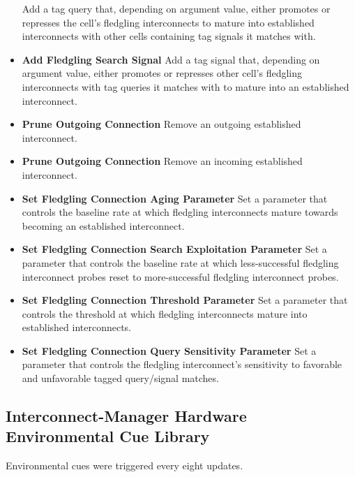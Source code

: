 \begin{itemize}
Add a tag query that, depending on argument value, either promotes or represses the cell's fledgling interconnects to mature into established interconnects with other cells containing tag signals it matches with.
\item \textbf{Add Fledgling Search Signal}
Add a tag signal that, depending on argument value, either promotes or represses other cell's fledgling interconnects with tag queries it matches with to mature into an established interconnect.
\item \textbf{Prune Outgoing Connection}
Remove an outgoing established interconnect.
\item \textbf{Prune Outgoing Connection}
Remove an incoming established interconnect.
\item \textbf{Set Fledgling Connection Aging Parameter}
Set a parameter that controls the baseline rate at which fledgling interconnects mature towards becoming an established interconnect.
\item \textbf{Set Fledgling Connection Search Exploitation Parameter}
Set a parameter that controls the baseline rate at which less-successful fledgling interconnect probes reset to more-successful fledgling interconnect  probes.
\item \textbf{Set Fledgling Connection Threshold Parameter}
Set a parameter that controls the threshold at which fledgling interconnects mature into established interconnects.
\item \textbf{Set Fledgling Connection Query Sensitivity Parameter}
Set a parameter that controls the fledgling interconnect's sensitivity to favorable and unfavorable tagged query/signal matches.
\end{itemize}

\subsection{Interconnect-Manager Hardware Environmental Cue Library}

Environmental cues were triggered every eight updates.

